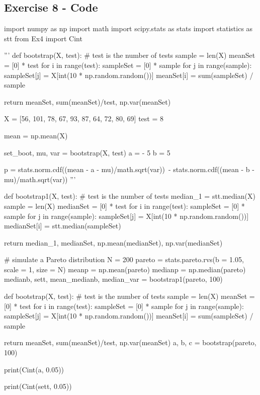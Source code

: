 \subsection*{Exercise 8 - Code}
\begin{python}
import numpy as np
import math
import scipy.stats as stats 
import statistics as stt
from Ex4 import Cint

'''
def bootstrap(X, test): # test is the number of tests
    sample = len(X)
    meanSet = [0] * test
    for i in range(test):
        sampleSet = [0] * sample
        for j in range(sample):
            sampleSet[j] = X[int(10 * np.random.random())]
        meanSet[i] = sum(sampleSet) / sample
    
    return meanSet, sum(meanSet)/test, np.var(meanSet)
        
    
X = [56, 101, 78, 67, 93, 87, 64, 72, 80, 69]
test = 8

mean = np.mean(X)

set_boot, mu, var = bootstrap(X, test)
a = - 5
b = 5

p = stats.norm.cdf((mean - a - mu)/math.sqrt(var))\
 - stats.norm.cdf((mean - b - mu)/math.sqrt(var))
'''

def bootstrap1(X, test): # test is the number of tests
    median_1 = stt.median(X)
    sample = len(X)
    medianSet = [0] * test
    for i in range(test):
        sampleSet = [0] * sample
        for j in range(sample):
            sampleSet[j] = X[int(10 * np.random.random())]
        medianSet[i] = stt.median(sampleSet)
    
    return median_1, medianSet, np.mean(medianSet), np.var(medianSet)

# simulate a Pareto distribution
N = 200
pareto = stats.pareto.rvs(b = 1.05, scale = 1, size = N)
meanp = np.mean(pareto)
medianp = np.median(pareto)
medianb, sett, mean_medianb, median_var = bootstrap1(pareto, 100)

def bootstrap(X, test): # test is the number of tests
    sample = len(X)
    meanSet = [0] * test
    for i in range(test):
        sampleSet = [0] * sample
        for j in range(sample):
            sampleSet[j] = X[int(10 * np.random.random())]
        meanSet[i] = sum(sampleSet) / sample
    
    return meanSet, sum(meanSet)/test, np.var(meanSet)
a, b, c = bootstrap(pareto, 100)

print(Cint(a, 0.05))

print(Cint(sett, 0.05))


\end{python}

